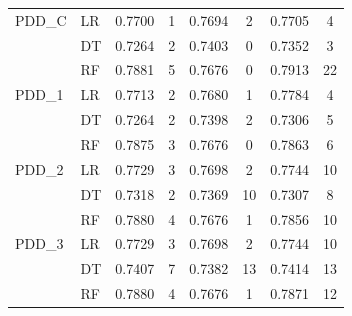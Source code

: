 \begin{table}[h]
\begin{tabular}{llcccccc}
    \midrule
    PDD\_C   & LR & 0.7700 & 1 & 0.7694 & 2 & 0.7705 & 4 \\
             & DT & 0.7264 & 2 & 0.7403 & 0 & 0.7352 & 3 \\
             & RF & 0.7881 & 5 & 0.7676 & 0 & 0.7913 & 22 \\
    \midrule
    PDD\_1   & LR & 0.7713 & 2 & 0.7680 & 1 & 0.7784 & 4 \\
             & DT & 0.7264 & 2 & 0.7398 & 2 & 0.7306 & 5 \\
             & RF & 0.7875 & 3 & 0.7676 & 0 & 0.7863 & 6 \\
    \midrule
    PDD\_2   & LR & 0.7729 & 3 & 0.7698 & 2 & 0.7744 & 10 \\
             & DT & 0.7318 & 2 & 0.7369 & 10 & 0.7307 & 8 \\
             & RF & 0.7880 & 4 & 0.7676 & 1 & 0.7856 & 10 \\
    \midrule
    PDD\_3   & LR & 0.7729 & 3 & 0.7698 & 2 & 0.7744 & 10 \\
             & DT & 0.7407 & 7 & 0.7382 & 13 & 0.7414 & 13 \\
             & RF & 0.7880 & 4 & 0.7676 & 1 & 0.7871 & 12 \\
    \bottomrule
    \end{tabular}
\end{table}

